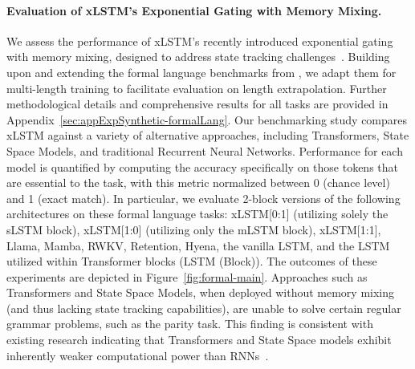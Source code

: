 \paragraph{Evaluation of xLSTM’s Exponential Gating with Memory Mixing.} We assess the performance of xLSTM’s recently introduced exponential gating with memory mixing, designed to address state tracking challenges~\citep{Merrill:24, Merrill:23}. Building upon and extending the formal language benchmarks from \citet{Deletang:23}, we adapt them for multi-length training to facilitate evaluation on length extrapolation. Further methodological details and comprehensive results for all tasks are provided in Appendix~\ref{sec:appExpSynthetic-formalLang}. Our benchmarking study compares xLSTM against a variety of alternative approaches, including Transformers, State Space Models, and traditional Recurrent Neural Networks. Performance for each model is quantified by computing the accuracy specifically on those tokens that are essential to the task, with this metric normalized between 0 (chance level) and 1 (exact match). In particular, we evaluate 2-block versions of the following architectures on these formal language tasks: xLSTM[0:1] (utilizing solely the sLSTM block), xLSTM[1:0] (utilizing only the mLSTM block), xLSTM[1:1], Llama, Mamba, RWKV, Retention, Hyena, the vanilla LSTM, and the LSTM utilized within Transformer blocks (LSTM (Block)). The outcomes of these experiments are depicted in Figure~\ref{fig:formal-main}. Approaches such as Transformers and State Space Models, when deployed without memory mixing (and thus lacking state tracking capabilities), are unable to solve certain regular grammar problems, such as the parity task. This finding is consistent with existing research indicating that Transformers and State Space models exhibit inherently weaker computational power than RNNs~\citep{Merrill:24, Merrill:23, Deletang:23}.


